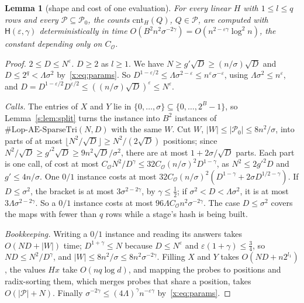 \documentclass[11pt]{article}
\newtheorem{lemma}[theorem]{Lemma}
\theoremstyle{definition}
\theoremstyle{remark}
\newcommand{\Lop}{\mathrm{Lop}\text{-}\allowbreak\mathrm{AE}\text{-}\allowbreak\mathrm{SparseTri}}
\newcommand{\cnt}{\mathrm{cnt}}
\newcommand{\Pq}{\mathcal{P}}
\newcommand{\Hyp}{\mathsf{H}}
\begin{document}
\begin{lemma}[shape and cost of one evaluation]\label{x:lem:shape}
For every linear $H$ with $1\le l\le q$ rows and every $\Pq\subseteq\Pq_0$, the counts $\cnt_H(Q)$, $Q\in\Pq$, are computed with $\Hyp(\varepsilon,\gamma)$ deterministically in time $O(B^2n^2\sigma^{-2\gamma})=O(n^{2-\varepsilon\gamma}\log^2n)$, the constant depending only on $C_{\mathcal O}$.
\end{lemma}
\begin{proof}
\emph{$2\le D\le N^\varepsilon$.} $D\ge2$ as $l\ge1$. We have $N\ge g'\sqrt D\ge(n/\sigma)\sqrt D$ and $D\le2^q<\Lambda\sigma^2$ by~\eqref{x:eq:params}. So $D^{1-\varepsilon/2}\le\Lambda\sigma^{2-\varepsilon}\le n^\varepsilon\sigma^{-\varepsilon}$, using $\Lambda\sigma^2\le n^\varepsilon$, and $D=D^{1-\varepsilon/2}D^{\varepsilon/2}\le((n/\sigma)\sqrt D)^\varepsilon\le N^\varepsilon$.

\emph{Calls.} The entries of $X$ and $Y$ lie in $\{0,\dots,\sigma\}\subseteq\{0,\dots,2^B-1\}$, so Lemma~\ref{s:lem:split} turns the instance into $B^2$ instances of $\#\Lop(N,D)$ with the same $W$. Cut $W$, $|W|\le|\Pq_0|\le8n^2/\sigma$, into parts of at most $\lfloor N^2/\sqrt D\rfloor\ge N^2/(2\sqrt D)$ positions; since $N^2/\sqrt D\ge g'^2\sqrt D\ge9n^2\sqrt D/\sigma^2$, there are at most $1+2\sigma/\sqrt D$ parts. Each part is one call, of cost at most $C_{\mathcal O}N^2/D^\gamma\le32C_{\mathcal O}(n/\sigma)^2D^{1-\gamma}$, as $N^2\le2g'^2D$ and $g'\le4n/\sigma$. One $0/1$ instance costs at most $32C_{\mathcal O}(n/\sigma)^2(D^{1-\gamma}+2\sigma D^{1/2-\gamma})$. If $D\le\sigma^2$, the bracket is at most $3\sigma^{2-2\gamma}$, by $\gamma\le\frac12$; if $\sigma^2<D<\Lambda\sigma^2$, it is at most $3\Lambda\sigma^{2-2\gamma}$. So a $0/1$ instance costs at most $96\Lambda C_{\mathcal O}n^2\sigma^{-2\gamma}$. The case $D\le\sigma^2$ covers the maps with fewer than $q$ rows while a stage's hash is being built.

\emph{Bookkeeping.} Writing a $0/1$ instance and reading its answers takes $O(ND+|W|)$ time; $D^{1+\gamma}\le N$ because $D\le N^\varepsilon$ and $\varepsilon(1+\gamma)\le\frac34$, so $ND\le N^2/D^\gamma$, and $|W|\le8n^2/\sigma\le8n^2\sigma^{-2\gamma}$. Filling $X$ and $Y$ takes $O(ND+n2^{l_1})$, the values $Hx$ take $O(nq\log d)$, and mapping the probes to positions and radix-sorting them, which merges probes that share a position, takes $O(|\Pq|+N)$. Finally $\sigma^{-2\gamma}\le(4\Lambda)^\gamma n^{-\varepsilon\gamma}$ by~\eqref{x:eq:params}.
\end{proof}
\end{document}
